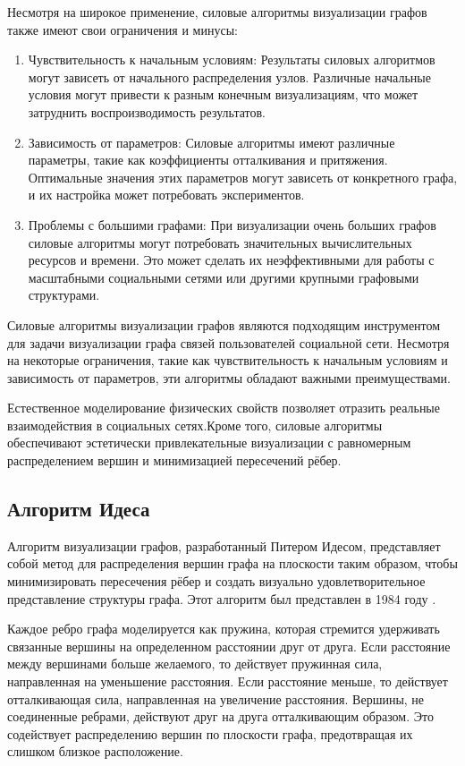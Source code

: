 \documentclass[14pt, russian]{scrartcl}
\begin{document}
Несмотря на  широкое применение, силовые алгоритмы визуализации графов также имеют свои ограничения и минусы:

\begin{enumerate}
  \item{Чувствительность к начальным условиям: Результаты силовых алгоритмов могут зависеть от начального распределения узлов. Различные начальные условия могут привести к разным конечным визуализациям, что может затруднить воспроизводимость результатов.}
  \item{Зависимость от параметров: Силовые алгоритмы имеют различные параметры, такие как коэффициенты отталкивания и притяжения. Оптимальные значения этих параметров могут зависеть от конкретного графа, и их настройка может потребовать экспериментов.}
  \item{Проблемы с большими графами:
При визуализации очень больших графов силовые алгоритмы могут потребовать значительных вычислительных ресурсов и времени. Это может сделать их неэффективными для работы с масштабными социальными сетями или другими крупными графовыми структурами.}
\end{enumerate}

Силовые алгоритмы визуализации графов являются подходящим инструментом для задачи визуализации графа связей пользователей социальной сети. Несмотря на некоторые ограничения, такие как чувствительность к начальным условиям и зависимость от параметров, эти алгоритмы обладают важными преимуществами.

Естественное моделирование физических свойств позволяет отразить реальные взаимодействия в социальных сетях.Кроме того, силовые алгоритмы обеспечивают эстетически привлекательные визуализации с равномерным распределением вершин и минимизацией пересечений рёбер.



\subsection{Алгоритм Идеса}

Алгоритм визуализации графов, разработанный Питером Идесом, представляет собой метод для распределения вершин графа на плоскости таким образом, чтобы минимизировать пересечения рёбер и создать визуально удовлетворительное представление структуры графа. Этот алгоритм был представлен в 1984 году \cite{Eades}.

Каждое ребро графа моделируется как пружина, которая стремится удерживать связанные вершины на определенном расстоянии друг от друга. Если расстояние между вершинами больше желаемого, то действует пружинная сила, направленная на уменьшение расстояния. Если расстояние меньше, то действует отталкивающая сила, направленная на увеличение расстояния. Вершины, не соединенные ребрами, действуют друг на друга отталкивающим образом. Это содействует распределению вершин по плоскости графа, предотвращая их слишком близкое расположение. 
\end{document}
